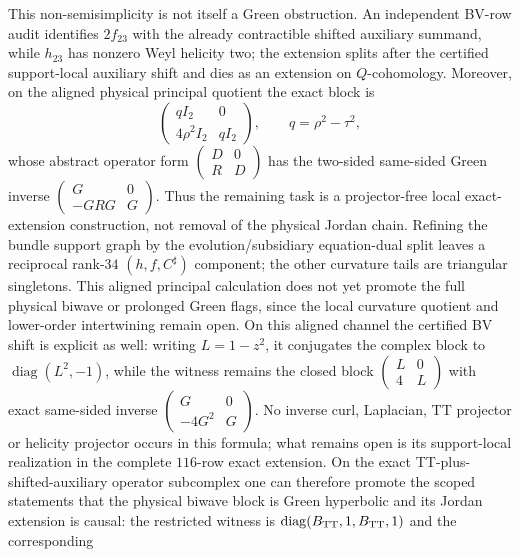 \documentclass[11pt]{article}
\theoremstyle{definition}
\theoremstyle{remark}
\newcommand{\R}{\mathbb R}
\begin{document}
This non-semisimplicity is not itself a Green obstruction.  An independent
BV-row audit identifies $2f_{23}$ with the already contractible shifted
auxiliary summand, while $h_{23}$ has nonzero Weyl helicity two; the
extension splits after the certified support-local auxiliary shift and dies
as an extension on $Q$-cohomology.  Moreover, on the aligned physical
principal quotient the exact block is
\[
 \begin{pmatrix}qI_2&0\\4\rho^2I_2&qI_2\end{pmatrix},
 \qquad q=\rho^2-\tau^2,
\]
whose abstract operator form $\left(\begin{smallmatrix}D&0\\R&D\end{smallmatrix}\right)$
has the two-sided same-sided Green inverse
$\left(\begin{smallmatrix}G&0\\-GRG&G\end{smallmatrix}\right)$.  Thus the
remaining task is a projector-free local exact-extension construction, not
removal of the physical Jordan chain.  Refining the bundle support graph by
the evolution/subsidiary equation-dual split leaves a reciprocal rank-$34$
$(h,f,C^\sharp)$ component; the other curvature tails are triangular
singletons.  This aligned principal calculation does not yet promote the
full physical biwave or prolonged Green flags, since the local curvature
quotient and lower-order intertwining remain open.
On this aligned channel the certified BV shift is explicit as well: writing
$L=1-z^2$, it conjugates the complex block to
$\operatorname{diag}(L^2,-1)$, while the witness remains the closed block
$\left(\begin{smallmatrix}L&0\\4&L\end{smallmatrix}\right)$ with exact
same-sided inverse
$\left(\begin{smallmatrix}G&0\\-4G^2&G\end{smallmatrix}\right)$.  No inverse
curl, Laplacian, TT projector or helicity projector occurs in this formula;
what remains open is its support-local realization in the complete
$116$-row exact extension.
On the exact TT-plus-shifted-auxiliary operator subcomplex one can therefore
promote the scoped statements that the physical biwave block is Green
hyperbolic and its Jordan extension is causal: the restricted witness is
$\operatorname{diag}(B_{\rm TT},1,B_{\rm TT},1)$ and the corresponding
\end{document}
